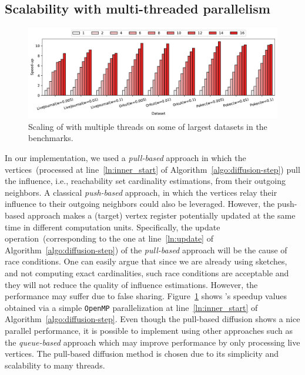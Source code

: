 \documentclass[review]{elsarticle}
\newcommand\acro{{\sc{HyperFuseR\xspace}\xspace}\xspace}
\begin{document}
\subsection{Scalability with multi-threaded parallelism}

\begin{figure}[!ht] 
    \centering
    \includegraphics[width=\linewidth]{images/threads.pdf}
   \centering \caption{Scaling of \acro with multiple threads on some of largest datasets in the benchmarks.
     \label{fig:scaling}} 
\end{figure}

In our implementation, we used a {\em pull-based} approach in which the vertices~(processed at line~\ref{ln:inner_start} of Algorithm~\ref{algo:diffusion-step}) pull the influence, i.e., reachability set cardinality estimations, from their outgoing neighbors. A classical {\em push-based} approach, in which the vertices relay their influence to their outgoing neighbors could also be leveraged. However, the push-based approach makes a (target) vertex register potentially updated at the same time in different computation units. Specifically, the update operation~(corresponding to the one at line~\ref{ln:update} of Algorithm~\ref{algo:diffusion-step}) of the {\em pull-based} approach will be the cause of race conditions. One can easily argue that since we are already using sketches, and not computing exact cardinalities, such race conditions are acceptable and they will not reduce the quality of influence estimations. However, the performance may suffer due to false sharing. Figure~\ref{fig:scaling} shows \acro's speedup values obtained via a simple {\tt OpenMP} parallelization at line~\ref{ln:inner_start} of Algorithm~\ref{algo:diffusion-step}. Even though the pull-based diffusion shows a nice parallel performance, it is possible to implement \acro using other approaches such as the {\em queue-based} approach which may improve performance by only processing live vertices. The pull-based diffusion method is chosen due to its simplicity and scalability to many threads.
\end{document}
